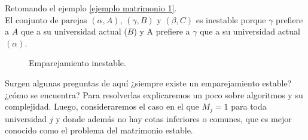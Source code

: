 \begin{eje}
Retomando el ejemplo \ref{ejemplo matrimonio 1}. \\
El conjunto de parejas $(\alpha, A)$, $(\gamma, B)$ y $(\beta, C)$ es inestable porque $\gamma$ prefiere a $A$ que a su universidad actual ($B$) y A prefiere a $\gamma$ que a su universidad actual $(\alpha)$.

\begin{figure}[H]\centering


\caption{Emparejamiento inestable.}
\end{figure}
\fin
\end{eje}


Surgen algunas preguntas de aquí ¿siempre existe un emparejamiento estable? ¿cómo se encuentra? Para resolverlas explicaremos un poco sobre algoritmos y su complejidad. Luego, consideraremos el caso en el que $M_j=1$ para toda universidad $j$ y donde además no hay cotas inferiores o comunes, que es mejor conocido como el problema del matrimonio estable. 
